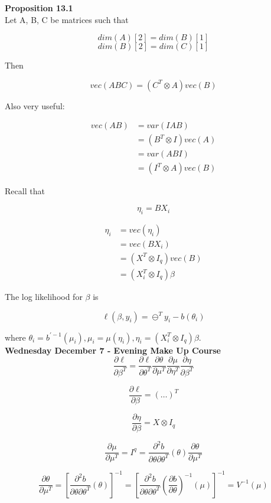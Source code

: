 \documentclass[11pt,fleqn]{book} %
\begin{document}
\textbf{Proposition 13.1}\\

Let A, B, C be matrices such that 

	$$dim(A)[2] = dim(B)[1]  $$
	$$dim(B)[2] = dim(C)[1]  $$

Then
	
	$$vec(ABC) = (C^T \otimes A) vec(B) $$

Also very useful:

		\begin{align*}
			vec(AB) &= var(IAB)\\
				&= (B^T \otimes I) vec(A)\\
				&= var(ABI)\\
				&= (I^T \otimes A) vec(B)
		\end{align*}

Recall that 

		$$\eta_i = B X_i $$



		\begin{align*}
			\eta_i &= vec(\eta_i)\\
				&=	vec(B X_i)\\
				&= (X^T \otimes I_q) vec(B)\\
				&= (X_i^T \otimes I_q) \beta
		\end{align*}

		The log likelihood for $\beta$ is 

			$$\ell(\beta, y_i) = \ominus^T y_i - b(\theta_i) $$

where $\theta_i = b^{'-1}(\mu_i), \mu_i = \mu(\eta_i), \eta_i = (X_i^T \otimes I_q) \beta$. \\



\textbf{Wednesday December 7 - Evening Make Up Course}\\


		$$\frac{\partial \ell}{ \partial \beta^T} = \frac{\partial \ell}{\partial \theta^T} \frac{\partial \theta}{\partial \mu^T} \frac{\partial \mu}{\partial \eta^T} \frac{\partial \eta}{\partial\beta^T}$$

		$$\frac{\partial \ell}{ \partial \beta} = (\dots)^T$$

		$$\frac{\partial \eta}{ \partial \beta} = X \otimes I_q $$

		$$\frac{\partial \mu}{ \partial \mu^T} = I^q = \frac{\partial^2 b}{ \partial \theta \partial \theta^T} (\theta) \frac{\partial \theta}{ \partial \mu^T}   $$

		$$\frac{\partial \theta}{ \partial \mu^T} = \left[\frac{\partial^2 b}{ \partial \theta \partial \theta^T} (\theta) \right]^{-1} = \left[\frac{\partial^2 b}{ \partial \theta \partial \theta^T} (\frac{\partial b}{\partial \theta})^{-1} (\mu) \right]^{-1} = V^{-1}(\mu) $$
\end{document}
